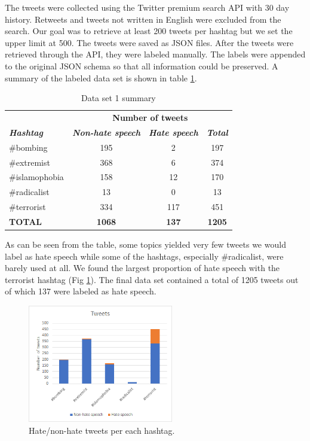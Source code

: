 \documentclass[conference]{IEEEtran}
\begin{document}
The tweets were collected using the Twitter premium search API with 30 day history. Retweets 
and tweets not written in English were excluded from the search. Our goal was to retrieve at least 
200 tweets per hashtag but we set the upper limit at 500. The tweets were saved as JSON files. 
After the tweets were retrieved through the API, they were labeled manually. The labels were appended  
to the original JSON schema so that all information could be preserved. 
A summary of the labeled data set is shown in table 
\ref{tab:data_set_1_summary}.

\begin{table}[!ht]
    \def\arraystretch{1.2}%
    \begin{center}
      \caption{Data set 1 summary}
      \label{tab:data_set_1_summary}
      \begin{tabular}{l c c c}
        \hline\hline
        &\multicolumn{3}{c}{\textbf{Number of tweets}} \\
        \textbf{\textit{Hashtag}}& \textbf{\textit{Non-hate speech}}& \textbf{\textit{Hate speech}} & \textbf{\textit{Total}}  \\
        \cline{2-4} 
        \hline
        \#bombing & 195 & 2 & 197\\
        \#extremist & 368 & 6 & 374\\
        \#islamophobia & 158 & 12 & 170\\
        \#radicalist & 13 & 0 & 13\\
        \#terrorist & 334 & 117 & 451\\
        \hline
        \textbf{TOTAL} & \textbf{1068} & \textbf{137} & \textbf{1205}\\
        \hline
      \end{tabular}  
    \end{center}
  \end{table}

As can be seen from the table, some topics yielded very few tweets we would label as hate speech 
while some of the hashtags, especially \#radicalist, were barely used at all. We found the largest
proportion of hate speech with the terrorist hashtag (Fig \ref{fig:data_set_1_summary}). The final 
data set contained a total of 1205 tweets out of which 137 were labeled as hate speech. 

\begin{figure}[htbp]
\centering
\centerline{\includegraphics[width=2.5in]{data_set_1_summary.png}}
\caption{Hate/non-hate tweets per each hashtag.}
\label{fig:data_set_1_summary}
\end{figure}
\end{document}
